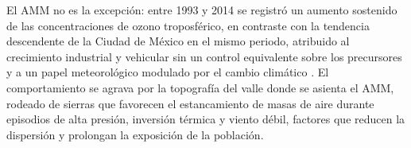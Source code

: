 El AMM no es la excepción: entre 1993 y 2014 se registró un aumento
sostenido de las concentraciones de ozono troposférico, en contraste con la
tendencia descendente de la Ciudad de México en el mismo periodo, atribuido
al crecimiento industrial y vehicular sin un control equivalente sobre los
precursores y a un papel meteorológico modulado por el cambio climático
\parencite{atmos15070779}. El comportamiento se agrava por la topografía del
valle donde se asienta el AMM, rodeado de sierras que favorecen el
estancamiento de masas de aire durante episodios de alta presión, inversión
térmica y viento débil, factores que reducen la dispersión y prolongan la
exposición de la población.
